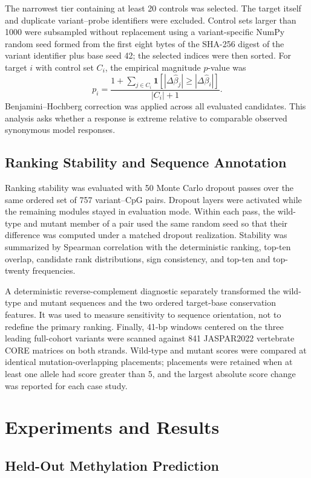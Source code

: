 \documentclass[10pt,letterpaper,twocolumn]{article}
\begin{document}
The narrowest tier containing at least 20 controls was selected. The
target itself and duplicate variant--probe identifiers were excluded.
Control sets larger than 1000 were subsampled without replacement using
a variant-specific NumPy random seed formed from the first eight bytes
of the SHA-256 digest of the variant identifier plus base seed 42; the
selected indices were then sorted. For target $i$ with control set
$C_i$, the empirical magnitude $p$-value was
\[
p_i=
\frac{1+\sum_{j\in C_i}
\mathbf1\left[|\Delta\hat\beta_j|\ge
|\Delta\hat\beta_i|\right]}
{|C_i|+1}.
\]
Benjamini--Hochberg correction was applied across all evaluated
candidates. This analysis asks whether a response is extreme relative
to comparable observed synonymous model responses.

\subsection{Ranking Stability and Sequence Annotation}

Ranking stability was evaluated with 50 Monte Carlo dropout passes over
the same ordered set of 757 variant--CpG pairs. Dropout layers were
activated while the remaining modules stayed in evaluation mode. Within
each pass, the wild-type and mutant member of a pair used the same random
seed so that their difference was computed under a matched dropout
realization. Stability was summarized by Spearman correlation with the
deterministic ranking, top-ten overlap, candidate rank distributions,
sign consistency, and top-ten and top-twenty frequencies.

A deterministic reverse-complement diagnostic separately transformed
the wild-type and mutant sequences and the two ordered target-base
conservation features. It was used to measure sensitivity to sequence
orientation, not to redefine the primary ranking. Finally, 41-bp
windows centered on the three leading full-cohort variants were scanned
against 841 JASPAR2022 vertebrate CORE matrices on both strands.
Wild-type and mutant scores were compared at identical
mutation-overlapping placements; placements were retained when at least
one allele had score greater than 5, and the largest absolute score
change was reported for each case study.

\section{Experiments and Results}
\label{sec:results}

\subsection{Held-Out Methylation Prediction}
\end{document}
